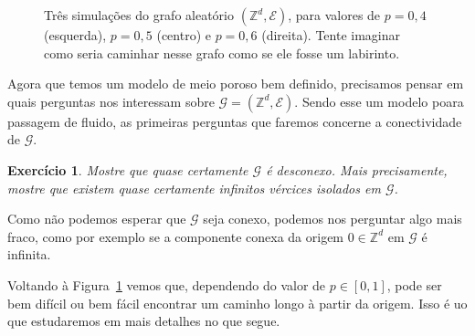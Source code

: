 \documentclass[reqno, final]{book}
\newcommand*\1{\mathds{1}}
\newtheorem{exercise}[example]{Exercício}
\begin{document}
\begin{figure}[!ht]
  \centering
  \caption{Três simulações do grafo aleatório $(\mathbb{Z}^d, \mathcal{E})$, para valores de $p = 0,4$ (esquerda), $p = 0,5$ (centro) e $p = 0,6$ (direita). Tente imaginar como seria caminhar nesse grafo como se ele fosse um labirinto.}
  \label{f:percola}
\end{figure}

Agora que temos um modelo de meio poroso bem definido, precisamos pensar em quais perguntas nos interessam sobre $\mathcal{G} = (\mathbb{Z}^d, \mathcal{E})$.
Sendo esse um modelo poara passagem de fluido, as primeiras perguntas que faremos concerne a conectividade de $\mathcal{G}$.

\begin{exercise}
  Mostre que quase certamente $\mathcal{G}$ é desconexo.
  Mais precisamente, mostre que existem quase certamente infinitos vércices isolados em $\mathcal{G}$.
\end{exercise}

Como não podemos esperar que $\mathcal{G}$ seja conexo, podemos nos perguntar algo mais fraco, como por exemplo se a componente conexa da origem $0 \in \mathbb{Z}^d$ em $\mathcal{G}$ é infinita.

Voltando à Figura~\ref{f:percola} vemos que, dependendo do valor de $p \in [0,1]$, pode ser bem difícil ou bem fácil encontrar um caminho longo à partir da origem.
Isso é uo que estudaremos em mais detalhes no que segue.
\end{document}
